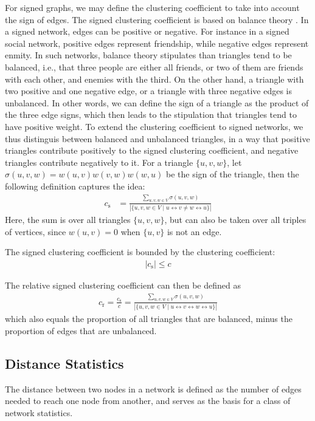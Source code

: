 \documentclass{article}
\begin{document}
For signed graphs, we may define the clustering coefficient to take into
account the sign of edges.  The signed clustering coefficient is based
on balance theory \citep{kunegis:slashdot-zoo}.  In a signed network,
edges can be positive or negative.  For instance in a signed social
network, positive edges represent friendship, while negative edges
represent enmity.  In such networks, balance theory stipulates than
triangles tend to be balanced, i.e., that three people are either all
friends, or two of them are friends with each other, and enemies with
the third.  On the other hand, a triangle with two positive and one
negative edge, or a triangle with three negative edges is unbalanced.
In other words, we can define the sign of a triangle as the product of
the three edge signs, which then leads to the stipulation that triangles
tend to have positive weight.  To extend the clustering coefficient to
signed networks, we thus distinguis between balanced and unbalanced
triangles, in a way that positive triangles contribute positively to the
signed clustering coefficient, and negative triangles contribute
negatively to it.  For a triangle $\{u,v,w\}$, let
$\sigma(u,v,w)=w(u,v)w(v,w)w(w,u)$ be the sign of the triangle, then the
following definition captures the idea:
\begin{align}
  c_{\mathrm s} &= \frac {\sum_{u,v,w\in V} \sigma(u,v,w)} {|\{ u, v, w
    \in V \mid u \leftrightarrow v \neq w \leftrightarrow u \}|}
\end{align}
Here, the sum is over all triangles $\{u,v,w\}$, but can also be taken
over all triples of vertices, since $w(u,v)=0$ when $\{u,v\}$ is not an
edge.

The signed clustering coefficient is bounded by the clustering
coefficient:
\begin{align}
  | c_{\mathrm s} | \leq c
\end{align}

The relative signed clustering coefficient can then be defined as
\begin{align}
  c_{\mathrm r} = \frac {c_{\mathrm s}} c = \frac {\sum_{u,v,w\in V}
    \sigma(u,v,w)} {|\{ u, v, w \in V \mid u \leftrightarrow v \leftrightarrow w \leftrightarrow u \}|}
\end{align}
which also equals the proportion of all triangles that are balanced,
minus the proportion of edges that are unbalanced.

\subsection{Distance Statistics}
\label{sec:distance-statistics}
The distance between two nodes in a network is defined as the number of
edges needed to reach one node from another, and serves as the basis for
a class of network statistics.
\end{document}
